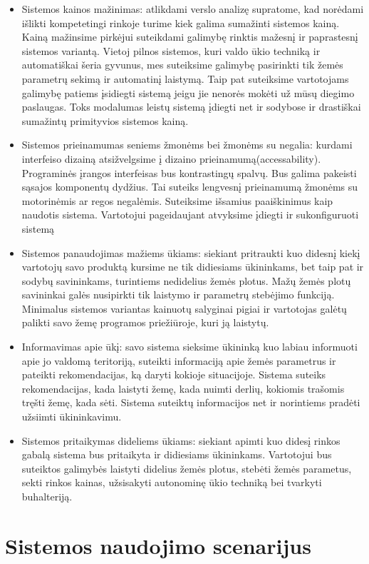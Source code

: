 \documentclass[oneside]{VUMIFPSkursinis}
\begin{document}
	\begin{itemize}
		\item{Sistemos kainos mažinimas: atlikdami verslo analizę supratome, kad norėdami išlikti kompetetingi rinkoje turime kiek galima sumažinti sistemos kainą. Kainą mažinsime pirkėjui suteikdami galimybę rinktis mažesnį ir paprastesnį sistemos variantą.  Vietoj pilnos sistemos, kuri valdo ūkio techniką ir automatiškai šeria gyvunus, mes suteiksime galimybę pasirinkti tik žemės parametrų sekimą ir automatinį laistymą. Taip pat suteiksime vartotojams galimybę patiems įsidiegti sistemą jeigu jie nenorės mokėti už mūsų diegimo paslaugas. Toks modalumas leistų sistemą įdiegti net ir sodybose ir drastiškai sumažintų primityvios sistemos kainą.}
		\item{Sistemos prieinamumas seniems žmonėms bei žmonėms su negalia: kurdami interfeiso dizainą atsižvelgsime į dizaino prieinamumą(accessability). Programinės įrangos interfeisas bus kontrastingų spalvų. Bus galima pakeisti sąsajos komponentų dydžius. Tai suteiks lengvesnį prieinamumą žmonėms su motorinėmis ar regos negalėmis. Suteiksime išsamius paaiškinimus kaip naudotis sistema. Vartotojui pageidaujant atvyksime įdiegti ir sukonfiguruoti sistemą}
		\item{Sistemos panaudojimas mažiems ūkiams: siekiant pritraukti kuo didesnį kiekį vartotojų savo produktą kursime ne tik didiesiams ūkininkams, bet taip pat ir sodybų savininkams, turintiems nedidelius žemės plotus. Mažų žemės plotų savininkai galės nusipirkti tik laistymo ir parametrų stebėjimo funkciją. Minimalus sistemos variantas kainuotų salyginai pigiai ir vartotojas galėtų palikti savo žemę programos priežiūroje, kuri ją laistytų.}
		\item{Informavimas apie ūkį: savo sistema sieksime ūkininką kuo labiau informuoti apie jo valdomą teritoriją, suteikti informaciją apie žemės parametrus ir pateikti rekomendacijas, ką daryti kokioje situacijoje. Sistema suteiks rekomendacijas, kada laistyti žemę, kada nuimti derlių, kokiomis trašomis tręšti žemę, kada sėti. Sistema suteiktų informacijos net ir norintiems pradėti užsiimti ūkininkavimu.}
		\item{Sistemos pritaikymas dideliems ūkiams: siekiant apimti kuo didesį rinkos gabalą sistema bus pritaikyta ir didiesiams ūkininkams. Vartotojui bus suteiktos galimybės laistyti didelius žemės plotus, stebėti žemės parametus, sekti rinkos kainas, užsisakyti autonominę ūkio techniką bei tvarkyti buhalteriją.}
	\end{itemize}
\section{Sistemos naudojimo scenarijus}
\end{document}
